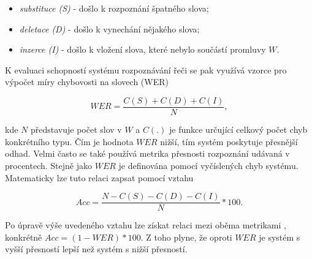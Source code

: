 \begin{itemize}
  \item \textit{substituce (S)} - došlo k rozpoznání špatného slova;
  \item \textit{deletace (D)} - došlo k vynechání nějakého slova;
  \item \textit{inzerce (I)} - došlo k vložení slova, které nebylo součástí promluvy $W$.
\end{itemize}

\noindent K evaluaci schopností systému rozpoznávání řeči se pak využívá vzorce pro výpočet míry chybovosti na slovech (WER)

\begin{equation}
  WER = \frac{C(S) + C(D) + C(I)}{N},
  \label{eq:asr:decoding:wer}
\end{equation}

\noindent kde $N$ představuje počet slov v $\hat{W}$ a $C(.)$ je funkce určující celkový počet chyb konkrétního typu. Čím je hodnota $WER$ nižší, tím systém poskytuje přesnější odhad. Velmi často se také používá metrika přesnosti rozpoznání udávaná v procentech. Stejně jako $WER$ je definována pomocí vyčíslených chyb systému. Matematicky lze tuto relaci zapsat pomocí vztahu

\begin{equation}
  Acc = \frac{N - C(S) - C(D) - C(I)}{N} * 100.
  \label{eq:asr:decoding:acc}
\end{equation}

\noindent Po úpravě výše uvedeného vztahu lze získat relaci mezi oběma metrikami , konkrétně $Acc = \left(1 - WER\right) * 100$. Z toho plyne, že oproti $WER$ je systém s vyšší přesností lepší než systém s nižší přesností.
